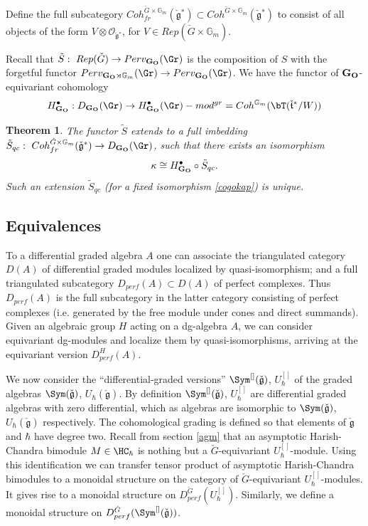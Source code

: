 \documentclass[11pt]{amsart}
\newtheorem{thm}{Theorem}
\theoremstyle{definition}
\theoremstyle{remark}
\renewcommand{\O}{{\mathcal O}}
\theoremstyle{remark}
\newcommand{\cal}{\mathcal}
\newcommand{\<}{\langle}
\renewcommand{\>}{\rangle}
\newcommand{\Lg}{\check{\mathfrak g}{}}
\newcommand{\Lt}{\check{\mathfrak t}{}}
\newcommand{\LG}{{\check{G}}}
\renewcommand{\O}{{\cal O}}
\newcommand{\GO}{{\bf G_O}}
\newcommand{\Gm}{{{\mathbb G}_m}}
\newcommand{\Sa}{S}
\newcommand{\Satil}{{\tilde S}}
\newcommand{\Dsym}{{\Sym^{[]}(\Lg)}}
\newcommand{\Duh}{{U_\hbar^{[]}}}
\begin{document}
Define the full subcategory  
 $Coh_{fr}^{\LG\times \Gm}(\Lg^*)\subset Coh^{\LG\times \Gm}(\Lg^*)$ 
to consist of all objects of the form 
$V\otimes \O_{\Lg^*}$, for $V\in Rep(\LG\times \Gm)$.


Recall that $\Satil:\ Rep(\LG)\to Perv_{\GO}(\Gr)$ 
is the composition of $\Sa$
with the forgetful functor $Perv_{\GO\rtimes \Gm}(\Gr)\to Perv_{\GO}(\Gr)$.
We have the functor of $\GO$-equivariant cohomology
$$H_\GO^\bullet: D_{\GO}(\Gr)\to H^\bullet_{\GO}(\Gr)
-mod^{gr} = Coh^{\Gm}(\bT(\Lt^*/W))$$ 


\begin{thm}\label{free_coh} The functor $\Satil$
extends to a full imbedding $\Satil_{qc}:\ Coh_{fr}^{\LG\times \Gm}(\Lg^*)\to
D_{\GO}(\Gr)$, such that there exists an isomorphism 
\begin{equation}\label{cogokap} 
\kappa \cong H_\GO^\bullet\circ \Satil_{qc}.
\end{equation}
Such an extension $\Satil_{qc}$ (for a  fixed isomorphism \eqref{cogokap})
is unique.
\end{thm}




\subsection{Equivalences}
To  a differential graded algebra $A$ one can associate
the triangulated  category $D(A)$  of differential graded modules localized
by quasi-isomorphism; and a full triangulated subcategory 
$D_{perf}(A)\subset D(A)$ 
of perfect complexes. Thus $D_{perf}(A)$ is
the full subcategory in the latter category consisting of perfect complexes
(i.e. generated by the free module under cones and direct summands).
Given an algebraic group $H$ acting
on a dg-algebra $A$, we can consider equivariant dg-modules and localize
them by quasi-isomorphisms, arriving at the equivariant version
$D^H_{perf}(A)$.

 We now consider the ``differential-graded versions'' $\Dsym$, $\Duh$
of the graded algebras 
$\Sym (\Lg)$, $U_\hbar(\Lg)$. By definition $\Dsym$, $\Duh$
are differential graded algebras with zero differential, which as algebras are
isomorphic to $\Sym(\Lg)$, $U_\hbar(\Lg)$ respectively. The cohomological
grading is defined so that elements of $\Lg$ and $\hbar$ have degree two.
Recall from section \ref{agm} that an
asymptotic Harish-Chandra bimodule $M\in\HC_\hbar$ is nothing but a
$\LG$-equivariant $\Duh$-module. Using this identification we can
transfer tensor product of asymptotic Harish-Chandra bimodules to
a monoidal structure on the category of $\LG$-equivariant
$\Duh$-modules. It gives rise to a monoidal structure on
$D^{\LG}_{perf}(\Duh)$. Similarly, we define a monoidal structure on 
$D^{\LG}_{perf}(\Dsym)$.
\end{document}
